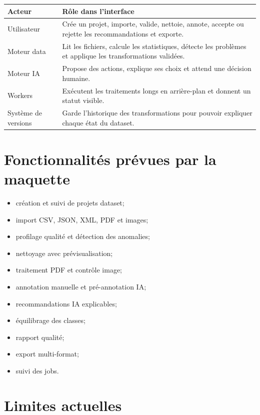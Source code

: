 \documentclass[10pt,a4paper]{article}
\begin{document}
\begin{tabular}{|p{}|p{}|}
\hline
\textbf{Acteur} & \textbf{R\^ole dans l'interface} \\
\hline
Utilisateur & Cr\'ee un projet, importe, valide, nettoie, annote, accepte ou rejette les recommandations et exporte. \\
\hline
Moteur data & Lit les fichiers, calcule les statistiques, d\'etecte les probl\`emes et applique les transformations valid\'ees. \\
\hline
Moteur IA & Propose des actions, explique ses choix et attend une d\'ecision humaine. \\
\hline
Workers & Ex\'ecutent les traitements longs en arri\`ere-plan et donnent un statut visible. \\
\hline
Syst\`eme de versions & Garde l'historique des transformations pour pouvoir expliquer chaque \'etat du dataset. \\
\hline
\end{tabular}

\section{Fonctionnalit\'es pr\'evues par la maquette}

\begin{itemize}
  \item cr\'eation et suivi de projets dataset;
  \item import CSV, JSON, XML, PDF et images;
  \item profilage qualit\'e et d\'etection des anomalies;
  \item nettoyage avec pr\'evisualisation;
  \item traitement PDF et contr\^ole image;
  \item annotation manuelle et pr\'e-annotation IA;
  \item recommandations IA explicables;
  \item \'equilibrage des classes;
  \item rapport qualit\'e;
  \item export multi-format;
  \item suivi des jobs.
\end{itemize}

\section{Limites actuelles}
\end{document}
